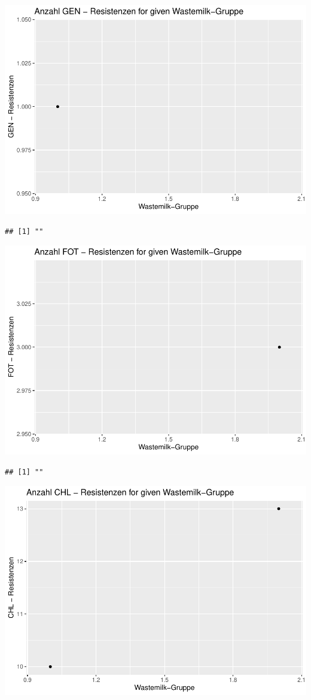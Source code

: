 \documentclass[
]{article}
\begin{document}
\includegraphics{NResistenzen_files/figure-latex/binary_or_nominal_variables-4.pdf}

\begin{verbatim}
## [1] ""
\end{verbatim}

\includegraphics{NResistenzen_files/figure-latex/binary_or_nominal_variables-5.pdf}

\begin{verbatim}
## [1] ""
\end{verbatim}

\includegraphics{NResistenzen_files/figure-latex/binary_or_nominal_variables-6.pdf}
\end{document}
